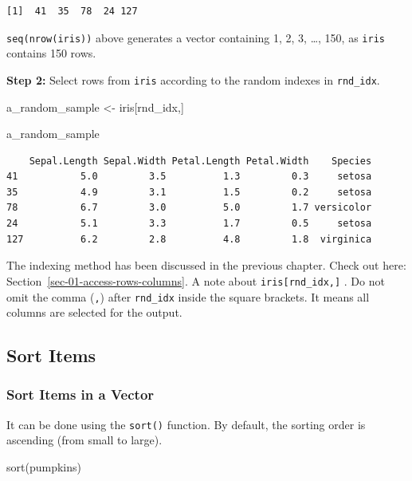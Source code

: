 \documentclass[
  letterpaper,
  DIV=11,
  numbers=noendperiod]{scrreprt}
\newenvironment{Shaded}{\begin{snugshade}}{\end{snugshade}}
\newcommand{\FunctionTok}[1]{\textcolor[rgb]{0.28,0.35,0.67}{#1}}
\newcommand{\NormalTok}[1]{\textcolor[rgb]{0.00,0.23,0.31}{#1}}
\newcommand{\OtherTok}[1]{\textcolor[rgb]{0.00,0.23,0.31}{#1}}
\begin{document}
\begin{verbatim}
[1]  41  35  78  24 127
\end{verbatim}

\texttt{seq(nrow(iris))} above generates a vector containing 1, 2, 3,
\ldots, 150, as \texttt{iris} contains 150 rows.

\textbf{Step 2:} Select rows from \texttt{iris} according to the random
indexes in \texttt{rnd\_idx}.

\begin{Shaded}
\begin{Highlighting}[]
\NormalTok{a\_random\_sample }\OtherTok{\textless{}{-}}\NormalTok{ iris[rnd\_idx,]}

\NormalTok{a\_random\_sample}
\end{Highlighting}
\end{Shaded}

\begin{verbatim}
    Sepal.Length Sepal.Width Petal.Length Petal.Width    Species
41           5.0         3.5          1.3         0.3     setosa
35           4.9         3.1          1.5         0.2     setosa
78           6.7         3.0          5.0         1.7 versicolor
24           5.1         3.3          1.7         0.5     setosa
127          6.2         2.8          4.8         1.8  virginica
\end{verbatim}

The indexing method has been discussed in the previous chapter. Check
out here: Section~\ref{sec-01-access-rows-columns}. A note about
\texttt{iris{[}rnd\_idx,{]}} . Do not omit the comma (\texttt{,}) after
\texttt{rnd\_idx} inside the square brackets. It means all columns are
selected for the output.

\subsection{Sort Items}\label{sort-items}

\subsubsection{Sort Items in a Vector}\label{sort-items-in-a-vector}

It can be done using the \texttt{sort()} function. By default, the
sorting order is ascending (from small to large).

\begin{Shaded}
\begin{Highlighting}[]
\FunctionTok{sort}\NormalTok{(pumpkins)}
\end{Highlighting}
\end{Shaded}
\end{document}
